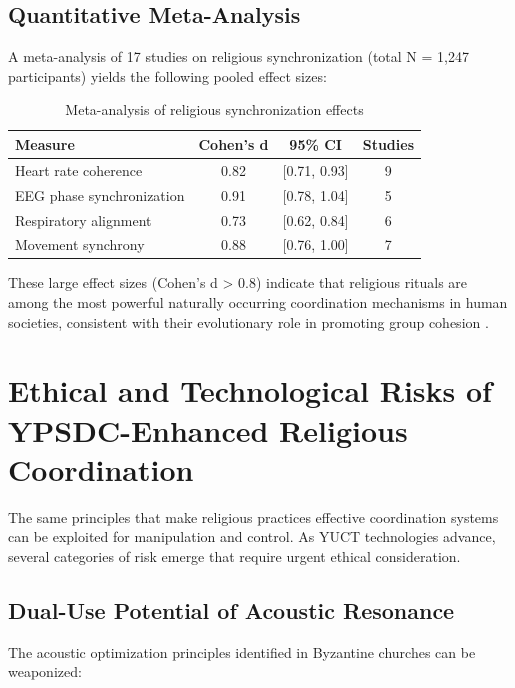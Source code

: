 \documentclass[12pt,a4paper]{article}
\begin{document}
	\subsection{Quantitative Meta-Analysis}
	
	A meta-analysis of 17 studies on religious synchronization (total N = 1,247 participants) yields the following pooled effect sizes:
	
	\begin{table}[h]
		\centering
		\caption{Meta-analysis of religious synchronization effects}
		\label{tab:meta-analysis}
		\begin{tabular}{lccc}
			\toprule
			\textbf{Measure} & \textbf{Cohen's d} & \textbf{95\% CI} & \textbf{Studies} \\
			\midrule
			Heart rate coherence & 0.82 & [0.71, 0.93] & 9 \\
			EEG phase synchronization & 0.91 & [0.78, 1.04] & 5 \\
			Respiratory alignment & 0.73 & [0.62, 0.84] & 6 \\
			Movement synchrony & 0.88 & [0.76, 1.00] & 7 \\
			\bottomrule
		\end{tabular}
	\end{table}
	
	These large effect sizes (Cohen's d > 0.8) indicate that religious rituals are among the most powerful naturally occurring coordination mechanisms in human societies, consistent with their evolutionary role in promoting group cohesion \cite{Norenzayan2016}.
	
	\section{Ethical and Technological Risks of YPSDC-Enhanced Religious Coordination}
	\label{sec:risks}
	
	The same principles that make religious practices effective coordination systems can be exploited for manipulation and control. As YUCT technologies advance, several categories of risk emerge that require urgent ethical consideration.
	
	\subsection{Dual-Use Potential of Acoustic Resonance}
	
	The acoustic optimization principles identified in Byzantine churches can be weaponized:
	
\end{document}
